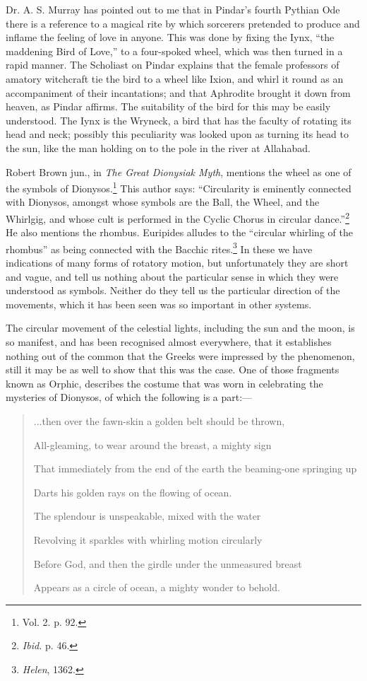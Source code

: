 \documentclass[a4paper, 11pt, oneside, polutonikogreek, english]{article}
\begin{document}
Dr. A. S. Murray has pointed out to me that in Pindar's fourth Pythian Ode there is a reference to a magical rite by which sorcerers pretended to produce and inflame the feeling of love in anyone. This was done by fixing the Iynx, ``the maddening Bird of Love,'' to a four-spoked wheel, which was then turned in a rapid manner. The Scholiast on Pindar explains that the female professors of amatory witchcraft tie the bird to a wheel like Ixion, and whirl it round as an accompaniment of their incantations; and that Aphrodite brought it down from heaven, as Pindar affirms. The suitability of the bird for this may be easily understood. The Iynx is the Wryneck, a bird that has the faculty of rotating its head and neck; possibly this peculiarity was looked upon as turning its head to the sun, like the man holding on to the pole in the river at Allahabad.

Robert Brown jun., in \emph{The Great Dionysiak Myth}, mentions the wheel as one of the symbols of Dionysos.\footnote{Vol. 2. p. 92.} This author says: ``Circularity is eminently connected with Dionysos, amongst whose symbols are the Ball, the Wheel, and the Whirlgig, and whose cult is performed in the Cyclic Chorus in circular dance.''\footnote{\emph{Ibid.} p. 46.} He also mentions the rhombus. Euripides alludes to the ``circular whirling of the rhombus'' as being connected with the Bacchic rites.\footnote{\emph{Helen}, 1362.} In these we have indications of many forms of rotatory motion, but unfortunately they are short and vague, and tell us nothing about the particular sense in which they were understood as symbols. Neither do they tell us the particular direction of the movements, which it has been seen was so important in other systems.

The circular movement of the celestial lights, including the sun and the moon, is so manifest, and has been recognised almost everywhere, that it establishes nothing out of the common that the Greeks were impressed by the phenomenon, still it may be as well to show that this was the case. One of those fragments known as Orphic, describes the costume that was worn in celebrating the mysteries of Dionysos, of which the following is a part:---

\begin{quotation}\small
...then over the fawn-skin a golden belt should be thrown,

All-gleaming, to wear around the breast, a mighty sign

That immediately from the end of the earth the beaming-one springing up

Darts his golden rays on the flowing of ocean.

The splendour is unspeakable, mixed with the water

Revolving it sparkles with whirling motion circularly

Before God, and then the girdle under the unmeasured breast

Appears as a circle of ocean, a mighty wonder to behold.
\end{quotation}
\end{document}
